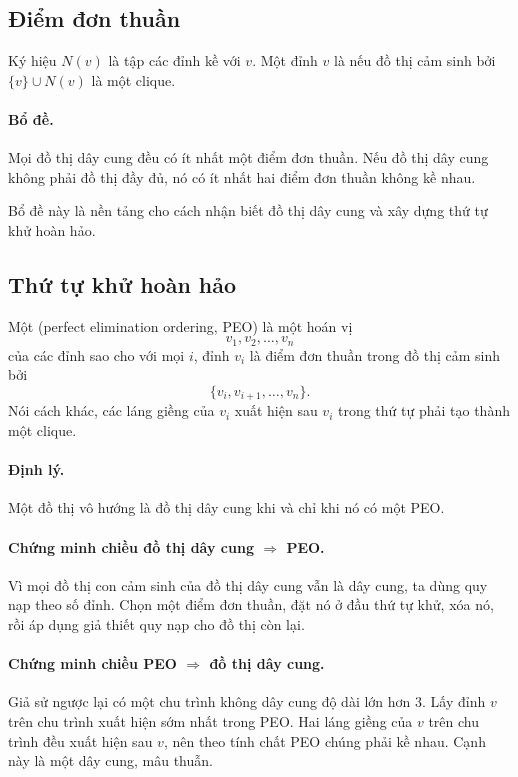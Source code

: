 \documentclass[11pt]{article}
\begin{document}
\subsection{Điểm đơn thuần}

Ký hiệu \(N(v)\) là tập các đỉnh kề với \(v\). Một đỉnh \(v\) là
 nếu đồ thị cảm sinh bởi \(\{v\}\cup N(v)\) là một clique.

\paragraph{Bổ đề.}
Mọi đồ thị dây cung đều có ít nhất một điểm đơn thuần. Nếu đồ thị dây cung
không phải đồ thị đầy đủ, nó có ít nhất hai điểm đơn thuần không kề nhau.

Bổ đề này là nền tảng cho cách nhận biết đồ thị dây cung và xây dựng thứ tự
khử hoàn hảo.

\subsection{Thứ tự khử hoàn hảo}

Một  (perfect elimination ordering, PEO) là một
hoán vị
\[
  v_1,v_2,\ldots,v_n
\]
của các đỉnh sao cho với mọi \(i\), đỉnh \(v_i\) là điểm đơn thuần trong đồ
thị cảm sinh bởi
\[
  \{v_i,v_{i+1},\ldots,v_n\}.
\]
Nói cách khác, các láng giềng của \(v_i\) xuất hiện sau \(v_i\) trong thứ tự
phải tạo thành một clique.

\paragraph{Định lý.}
Một đồ thị vô hướng là đồ thị dây cung khi và chỉ khi nó có một PEO.

\paragraph{Chứng minh chiều đồ thị dây cung \(\Rightarrow\) PEO.}
Vì mọi đồ thị con cảm sinh của đồ thị dây cung vẫn là dây cung, ta dùng quy
nạp theo số đỉnh. Chọn một điểm đơn thuần, đặt nó ở đầu thứ tự khử, xóa nó,
rồi áp dụng giả thiết quy nạp cho đồ thị còn lại.

\paragraph{Chứng minh chiều PEO \(\Rightarrow\) đồ thị dây cung.}
Giả sử ngược lại có một chu trình không dây cung độ dài lớn hơn \(3\). Lấy
đỉnh \(v\) trên chu trình xuất hiện sớm nhất trong PEO. Hai láng giềng của
\(v\) trên chu trình đều xuất hiện sau \(v\), nên theo tính chất PEO chúng
phải kề nhau. Cạnh này là một dây cung, mâu thuẫn.
\end{document}
